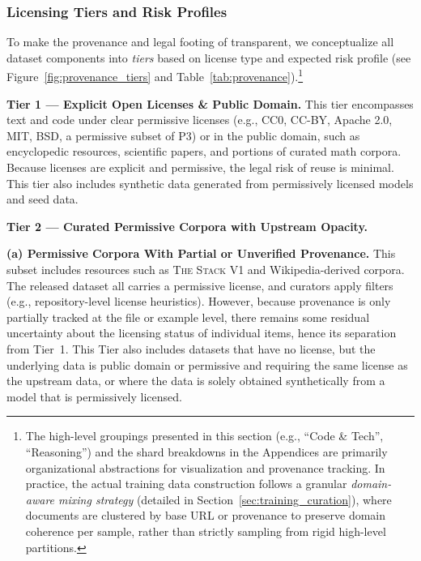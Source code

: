 \vspace{-0.5cm}
\subsubsection{Licensing Tiers and Risk Profiles}
\label{sec:license_tiers}

To make the provenance and legal footing of \MixtureVitae{} transparent, we conceptualize all dataset components into \emph{tiers} based on license type and expected risk profile (see Figure~\ref{fig:provenance_tiers} and Table~\ref{tab:provenance}).\footnote{The high-level groupings presented in this section (e.g., ``Code \& Tech'', ``Reasoning'') and the shard breakdowns in the Appendices are primarily organizational abstractions for visualization and provenance tracking. In practice, the actual training data construction follows a granular \textit{domain-aware mixing strategy} (detailed in Section~\ref{sec:training_curation}), where documents are clustered by base URL or provenance to preserve domain coherence per sample, rather than strictly sampling from rigid high-level partitions.} 

\textbf{Tier 1 --- Explicit Open Licenses \& Public Domain.}  
This tier encompasses text and code under clear permissive licenses (e.g., CC0, CC-BY, Apache 2.0, MIT, BSD, a permissive subset of P3) or in the public domain, such as encyclopedic resources, scientific papers, and portions of curated math corpora. Because licenses are explicit and permissive, the legal risk of reuse is minimal. This tier also includes synthetic data generated from permissively licensed models and seed data. 

\textbf{Tier 2 --- Curated Permissive Corpora with Upstream Opacity.}  

\textbf{(a) Permissive Corpora With Partial or Unverified Provenance.}
    This subset includes resources such as \textsc{The Stack V1} and Wikipedia-derived corpora. The released dataset all carries a permissive license, and curators apply filters (e.g., repository-level license heuristics). However, because provenance is only partially tracked at the file or example level, there remains some residual uncertainty about the licensing status of individual items, hence its separation from Tier~1. This Tier also includes datasets that have no license, but the underlying data is public domain or permissive and requiring the same license as the upstream data, or where the data is solely obtained synthetically from a model that is permissively licensed.
    
